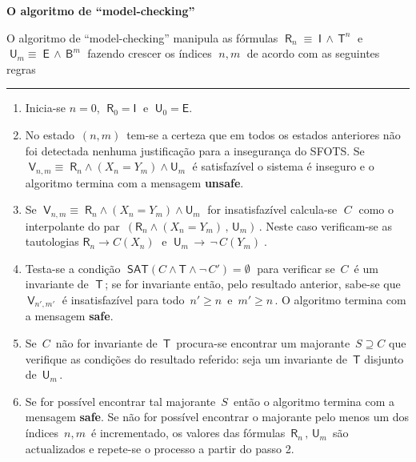 \documentclass[11pt]{article}
\begin{document}
    \hypertarget{o-algoritmo-de-model-checking}{%
    \textbf{\large O algoritmo de
``model-checking''}\label{o-algoritmo-de-model-checking}}

O algoritmo de ``model-checking'' manipula as fórmulas
\(\;\mathsf{R}_n\;\equiv\; \mathsf{I}\,\land\,\mathsf{T}^n\;\) e
\(\;\mathsf{U}_m\equiv\; \mathsf{E}\,\land\,\mathsf{B}^m\;\) fazendo
crescer os índices \(\;n,m\;\) de acordo com as seguintes regras

\begin{center}\rule{0.5\linewidth}{0.5pt}\end{center}

\begin{enumerate}
\def\labelenumi{\arabic{enumi}.}
\item
  Inicia-se \(n=0\), \(\;\mathsf{R}_0 = \mathsf{I}\;\) e
  \(\;\mathsf{U}_0 = \mathsf{E}\).
\item
  No estado \(\,(n,m)\,\) tem-se a certeza que em todos os estados
  anteriores não foi detectada nenhuma justificação para a insegurança
  do SFOTS. Se
  \(\;\mathsf{V}_{n,m}\equiv\;\mathsf{R}_n\land(X_n=Y_m)\land\mathsf{U}_m\;\)
  é satisfazível o sistema é inseguro e o algoritmo termina com a
  mensagem \textbf{unsafe}.
\item
  Se
  \(\;\mathsf{V}_{n,m}\equiv\;\mathsf{R}_n\land(X_n=Y_m)\land \mathsf{U}_m\;\)
  for insatisfazível calcula-se \(\;{C}\;\) como o interpolante do par
  \(\,(\mathsf{R}_n\land(X_n=Y_m)\,,\,\mathsf{U}_m)\,\). Neste caso
  verificam-se as tautologias \(\mathsf{R}_n \to C(X_n)\;\) e
  \(\;\mathsf{U}_m\,\to\,\neg\, C(Y_m)\;\).
\item
  Testa-se a condição
  \(\;\mathsf{SAT}(C\land\mathsf{T}\land\neg\,C')=\emptyset\;\) para
  verificar se \(\,C\,\) é um invariante de \(\;\mathsf{T}\,\); se for
  invariante então, pelo resultado anterior, sabe-se que
  \(\,\mathsf{V}_{n',m'}\;\) é insatisfazível para todo \(\,n'\ge n\,\)
  e \(\,m'\ge n\,\). O algoritmo termina com a mensagem \textbf{safe}.
\item
  Se \(\,C\,\) não for invariante de \(\,\mathsf{T}\,\) procura-se
  encontrar um majorante \(\,S \supseteq C\) que verifique as condições
  do resultado referido: seja um invariante de \(\,\mathsf{T}\) disjunto
  de \(\,\mathsf{U}_m\,\).
\item
  Se for possível encontrar tal majorante \(\,S\,\) então o algoritmo
  termina com a mensagem \textbf{safe}. Se não for possível encontrar o
  majorante pelo menos um dos índices \(\,n,m\,\) é incrementado, os
  valores das fórmulas \(\,\mathsf{R}_n\,,\,\mathsf{U}_m\,\) são
  actualizados e repete-se o processo a partir do passo 2.
\end{enumerate}
\end{document}
